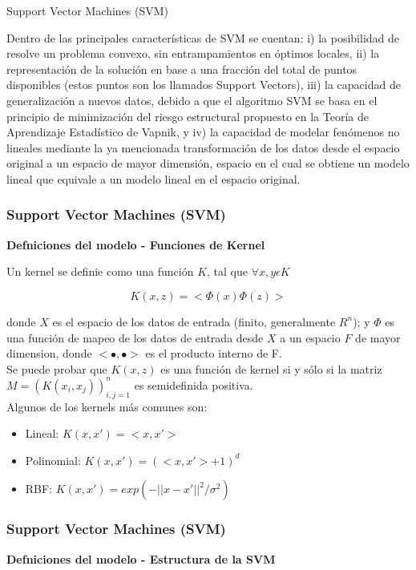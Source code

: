 \documentclass[spanish,xcolor=table]{beamer}
\begin{document}
\begin{section}{Support Vector Machines (SVM)}
\begin{frame}
Dentro de las principales caracter\'{i}sticas de SVM se cuentan: i) la posibilidad de resolve un problema convexo, sin entrampamientos en \'optimos locales, ii) la representaci\'on de la soluci\'on en base a una fracci\'on del total de puntos disponibles (estos puntos son los llamados Support Vectors), iii) la capacidad de generalizaci\'on a nuevos datos, debido a que el algoritmo SVM se basa en el principio de minimizaci\'on del riesgo estructural propuesto en la Teor\'{i}a de Aprendizaje Estad\'{i}stico de Vapnik, y iv) la capacidad de modelar fen\'omenos no lineales mediante la ya mencionada transformaci\'on de los datos desde el espacio original a un espacio de mayor dimensi\'on, espacio en el cual se obtiene un modelo lineal que equivale a un modelo lineal en el espacio original.
\end{frame}
\begin{frame}
\frametitle{Support Vector Machines (SVM)}
\textbf{Defniciones del modelo - Funciones de Kernel}

Un kernel se definie como una funci\'on $K$, tal que $\forall x, y \epsilon K$

\begin{equation*} 
K(x,z) = < \Phi(x) \Phi (z) >
\end{equation*}

donde $X$ es el espacio de los datos de entrada (finito, generalmente $R^n$); y $\Phi$ es una funci\'on de mapeo de los datos de entrada desde $X$ a un espacio $F$ de mayor dimension, donde  $< \bullet , \bullet >$ es el producto interno de F. \\
Se puede probar que $K(x,z)$ es una funci\'on de kernel si y s\'olo si la matriz $M=(K(x_i , x_j))^n_{i , j=1}$ es semidefinida positiva. \\
Algunos de los kernels m\'as comunes son: \\
\begin{itemize}
  \item Lineal: $K(x,x') = <x,x'>$
  \item Polinomial: $K(x,x') = (<x,x'>+1)^d $ 
  \item RBF: $K(x,x') = exp ( - ||x - x' ||^2 / \sigma^2) $
\end{itemize}    

\end{frame}
\begin{frame}
\frametitle{Support Vector Machines (SVM)}
\textbf{Defniciones del modelo - Estructura de la SVM}


\end{frame}
\end{section}
\end{document}
